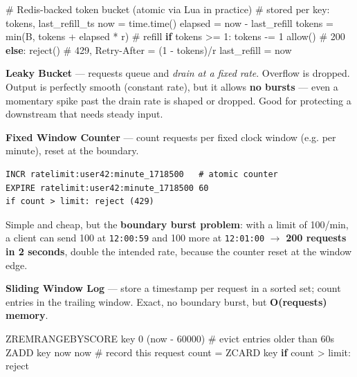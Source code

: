 \documentclass[11pt]{article}
\newenvironment{Shaded}{\begin{snugshade}}{\end{snugshade}}
\newcommand{\BuiltInTok}[1]{\textcolor[rgb]{0.50,0.55,0.55}{#1}}
\newcommand{\CommentTok}[1]{\textcolor[rgb]{0.48,0.49,0.49}{#1}}
\newcommand{\ControlFlowTok}[1]{\textcolor[rgb]{0.99,0.74,0.29}{\textbf{#1}}}
\newcommand{\DecValTok}[1]{\textcolor[rgb]{0.96,0.45,0.00}{#1}}
\newcommand{\NormalTok}[1]{\textcolor[rgb]{0.81,0.81,0.76}{#1}}
\newcommand{\OperatorTok}[1]{\textcolor[rgb]{0.81,0.81,0.76}{#1}}
\begin{document}
\begin{Shaded}
\begin{Highlighting}[]
\CommentTok{\# Redis{-}backed token bucket (atomic via Lua in practice)}
\CommentTok{\# stored per key: tokens, last\_refill\_ts}
\NormalTok{now }\OperatorTok{=}\NormalTok{ time.time()}
\NormalTok{elapsed }\OperatorTok{=}\NormalTok{ now }\OperatorTok{{-}}\NormalTok{ last\_refill}
\NormalTok{tokens }\OperatorTok{=} \BuiltInTok{min}\NormalTok{(B, tokens }\OperatorTok{+}\NormalTok{ elapsed }\OperatorTok{*}\NormalTok{ r)     }\CommentTok{\# refill}
\ControlFlowTok{if}\NormalTok{ tokens }\OperatorTok{\textgreater{}=} \DecValTok{1}\NormalTok{:}
\NormalTok{    tokens }\OperatorTok{{-}=} \DecValTok{1}
\NormalTok{    allow()                                }\CommentTok{\# 200}
\ControlFlowTok{else}\NormalTok{:}
\NormalTok{    reject()                               }\CommentTok{\# 429, Retry{-}After = (1 {-} tokens)/r}
\NormalTok{last\_refill }\OperatorTok{=}\NormalTok{ now}
\end{Highlighting}
\end{Shaded}

\textbf{Leaky Bucket} --- requests queue and \emph{drain at a fixed rate}. Overflow is dropped. Output is perfectly smooth (constant rate), but it allows \textbf{no bursts} --- even a momentary spike past the drain rate is shaped or dropped. Good for protecting a downstream that needs steady input.

\textbf{Fixed Window Counter} --- count requests per fixed clock window (e.g. per minute), reset at the boundary.

\setcodelang{}

\begin{verbatim}
INCR ratelimit:user42:minute_1718500   # atomic counter
EXPIRE ratelimit:user42:minute_1718500 60
if count > limit: reject (429)
\end{verbatim}

Simple and cheap, but the \textbf{boundary burst problem}: with a limit of 100/min, a client can send 100 at \texttt{12:00:59} and 100 more at \texttt{12:01:00} \(\rightarrow\) \textbf{200 requests in 2 seconds}, double the intended rate, because the counter reset at the window edge.

\textbf{Sliding Window Log} --- store a timestamp per request in a sorted set; count entries in the trailing window. Exact, no boundary burst, but \textbf{O(requests) memory}.


\begin{Shaded}
\begin{Highlighting}[]
\NormalTok{ZREMRANGEBYSCORE key }\DecValTok{0}\NormalTok{ (now }\OperatorTok{{-}} \DecValTok{60000}\NormalTok{)   }\CommentTok{\# evict entries older than 60s}
\NormalTok{ZADD key now now                        }\CommentTok{\# record this request}
\NormalTok{count }\OperatorTok{=}\NormalTok{ ZCARD key}
\ControlFlowTok{if}\NormalTok{ count }\OperatorTok{\textgreater{}}\NormalTok{ limit: reject}
\end{Highlighting}
\end{Shaded}
\end{document}
